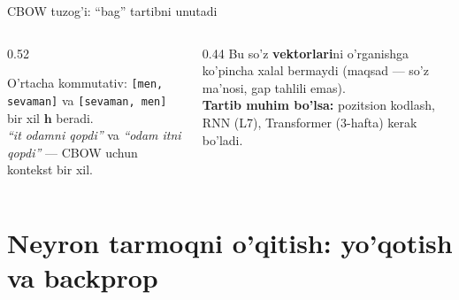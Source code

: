 \documentclass[aspectratio=169,11pt]{beamer}
\begin{document}
\begin{frame}{CBOW tuzog'i: ``bag'' tartibni unutadi}
  \begin{columns}[T]
    \begin{column}{0.52\textwidth}
      \begin{tcolorbox}[warnbox,title=Tartib yo'qoladi]
        \small
        O'rtacha kommutativ: \texttt{[men, sevaman]} va
        \texttt{[sevaman, men]} bir xil $\mathbf{h}$ beradi.\\[3pt]
        \textit{``it odamni qopdi''} va \textit{``odam itni qopdi''} ---
        CBOW uchun kontekst bir xil.
      \end{tcolorbox}
    \end{column}
    \begin{column}{0.44\textwidth}
      \footnotesize
      Bu so'z \textbf{vektorlari}ni o'rganishga ko'pincha xalal bermaydi
      (maqsad --- so'z ma'nosi, gap tahlili emas).\\[4pt]
      \textbf{Tartib muhim bo'lsa:} pozitsion kodlash, RNN (L7), Transformer
      (3-hafta) kerak bo'ladi.
    \end{column}
  \end{columns}
\end{frame}

\section[O'qitish]{Neyron tarmoqni o'qitish: yo'qotish va backprop}
\end{document}
